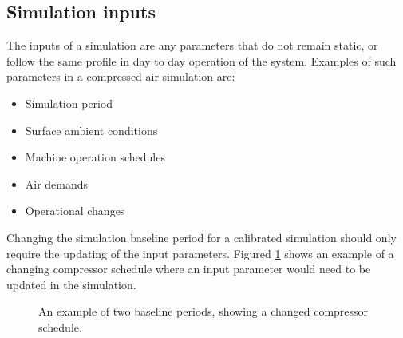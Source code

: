 	\subsection{Simulation inputs}
		The inputs of a simulation are any parameters that do not remain static, or follow the same profile in day to day operation of the system. Examples of such parameters in a compressed air simulation are:
		\begin{itemize}
			\item Simulation period
			\item Surface ambient conditions
			\item Machine operation schedules
			\item Air demands
			\item Operational changes
		\end{itemize} 
		Changing the simulation baseline period for a calibrated simulation should only require the updating of the input parameters. Figured \ref{fig: Compressor schedule} shows an example of a changing compressor schedule where an input parameter would need to be updated in the simulation.
		\begin{figure}[h]
			\centering
			\fbox{}
			\caption{An example of two baseline periods, showing a changed compressor schedule.}
			\label{fig: Compressor schedule}
		\end{figure}
